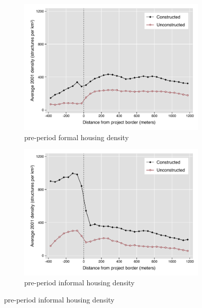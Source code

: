 \documentclass[12pt]{article}
\begin{document}
\begin{figure}[h!]
        \centering
        \caption[ Pre-Period Housing Densities in Constructed and Unconstructed Projects Areas ]
        {\small Pre-Period Housing Densities in Constructed and Unconstructed projects } 
        \begin{subfigure}[b]{0.495\textwidth}
            \centering
            \includegraphics[width=\textwidth,trim={0.3cm .3cm 0.1cm 0cm}, clip=true]{figures/bblu_for_pre_means_4.pdf}
            \caption[Network2]%
            {{\small pre-period formal housing density}}    
            \label{fig:prefor}
        \end{subfigure}
        \hfill
        \begin{subfigure}[b]{0.495\textwidth}  
            \centering 
            \includegraphics[width=\textwidth,trim={0.3cm .3cm 0.1cm 0cm}, clip=true]{figures/bblu_inf_pre_means_4.pdf}
            \caption[]%
            {{\small pre-period informal housing density}}    
            \label{fig:preinf}
        \end{subfigure}
        \label{fig:rawbblumeans}
        \vspace{-6mm}
    \end{figure} 
\end{document}
